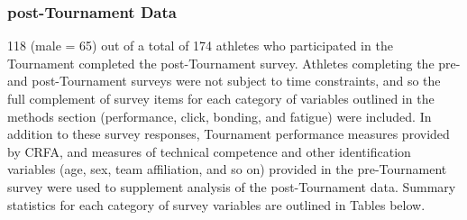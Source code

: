 \subsubsection{post-Tournament Data}

118 (male = 65) out of a total of 174 athletes who participated in the Tournament completed the post-Tournament survey. Athletes completing the pre- and post-Tournament surveys were not subject to time constraints, and so the full complement of survey items for each category of variables outlined in the methods section (performance, click, bonding, and fatigue) were included. In addition to these survey responses, Tournament performance measures provided by CRFA, and measures of technical competence and other identification variables (age, sex, team affiliation, and so on) provided in the pre-Tournament survey were used to supplement analysis of the post-Tournament data. Summary statistics for each category of survey variables are outlined in Tables below.








